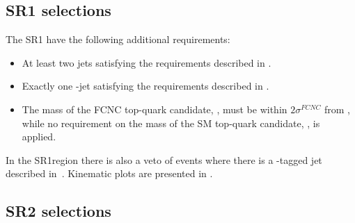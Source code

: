 \subsection{SR1 selections}
\label{sec:sel:sr1}
The SR1 have the following additional requirements:
\begin{itemize}
	\item At least two jets satisfying the requirements described in 
	. 
	\item Exactly one \Pqb-jet satisfying the requirements
	described in . 
	\item The mass of the FCNC top-quark candidate,
	\mtopfcnc, must be within $2\sigma^{FCNC}$ from \mtopvalue, while no
	requirement on the mass of the SM top-quark candidate, \mtopsm, is applied. 
\end{itemize}
In the SR1\tZc region there is also a veto of events where there is a \Pqc-tagged jet described in~.  Kinematic plots are presented in .

\subsection{SR2 selections}
\label{sec:sel:sr2}

